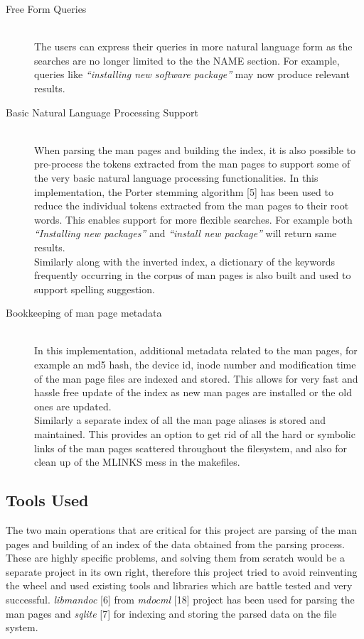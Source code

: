 \documentclass[letterpaper,twocolumn,10pt]{article}
\begin{document}
\begin{description}
\item[Free Form Queries] \hfill \\
The users can express their queries in more natural language form as the searches
are no longer limited to the the NAME section.
For example, queries like \textit{``installing new software package''} may
now produce relevant results.
\end{description}
\begin{description}
\item[Basic Natural Language Processing Support] \hfill \\
When parsing the man pages and building the index, it is also possible to
pre-process the tokens extracted from the man pages to support some of the very
basic natural language processing functionalities. In this implementation, the
Porter stemming algorithm [5] has been used to
reduce the individual tokens extracted from the man pages to their root words.
This enables support for more flexible searches. For example both
\textit{``Installing new packages''} and \textit{``install new package''} will
return same results. \\

Similarly along with the inverted index, a dictionary of the keywords frequently
occurring in the corpus of man pages is also built and used to support
spelling suggestion.
\end{description}
\begin{description}
\item[Bookkeeping of man page metadata] \hfill \\
In this implementation, additional metadata related to the man pages, for example
an md5 hash, the device id, inode number and modification time
of the man page files are indexed and stored.
This allows for very fast and hassle free update of the index as new man pages are installed or the old ones are updated. \\

Similarly a separate index of all the man page aliases is stored and maintained.
This provides an option to get rid of all the hard or symbolic links of the man
pages scattered throughout the filesystem, and also for clean up of the MLINKS
mess in the makefiles.
\end{description}

\subsection{Tools Used}
The two main operations that are critical for this project are parsing of the
man pages and building of an index of the
data obtained from the parsing process. These are highly specific problems, and
solving them from scratch would be a separate project in its own right, therefore this project tried to avoid reinventing the wheel and used existing
tools and libraries which are battle tested and very successful. \textit{libmandoc} [6] from \textit{mdocml} [18] project has been used for parsing the man pages and \textit{sqlite} [7] for indexing and storing the parsed
data on the file system.
\end{document}
